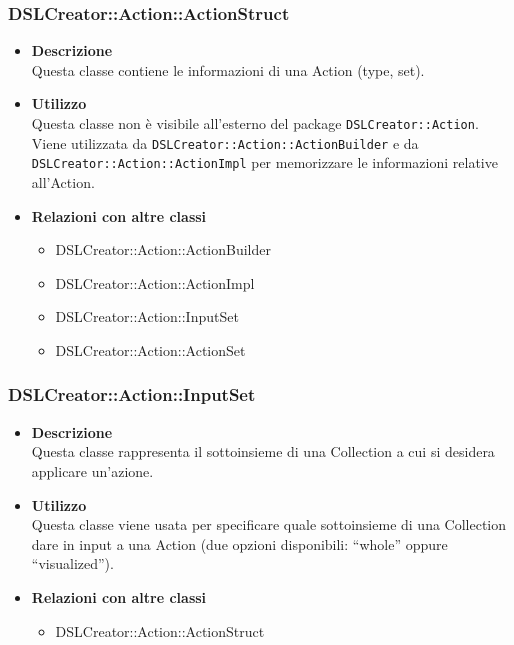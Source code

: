  \subsubsection{DSLCreator::Action::ActionStruct}
                    \begin{itemize}
                        \item \textbf{Descrizione} \hfill \\
                          Questa classe contiene le informazioni di una Action (type, set).
                        \item \textbf{Utilizzo} \hfill \\
                          Questa classe non è visibile all'esterno del package \texttt{DSLCreator::Action}. Viene utilizzata da \texttt{DSLCreator::Action::ActionBuilder} e da \texttt{DSLCrea\-tor::Action::ActionImpl} per memorizzare le informazioni relative all'Action.
                        \item \textbf{Relazioni con altre classi}
                            \begin{itemize}
                              \item DSLCreator::Action::ActionBuilder
                              \item DSLCreator::Action::ActionImpl
                              \item DSLCreator::Action::InputSet
                              \item DSLCreator::Action::ActionSet
                            \end{itemize}
                    \end{itemize}  

 \subsubsection{DSLCreator::Action::InputSet}
                    \begin{itemize}
                        \item \textbf{Descrizione} \hfill \\
                          Questa classe rappresenta il sottoinsieme di una Collection a cui si desidera applicare un'azione.
                        \item \textbf{Utilizzo} \hfill \\
                          Questa classe viene usata per specificare quale sottoinsieme di una Collection dare in input a una Action (due opzioni disponibili: ``whole'' oppure ``visualized'').
                        \item \textbf{Relazioni con altre classi}
                            \begin{itemize}
                              \item DSLCreator::Action::ActionStruct
                            \end{itemize}
                    \end{itemize}  

